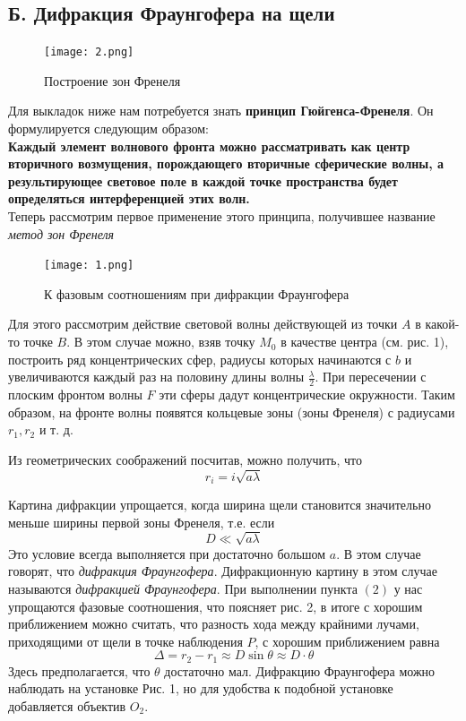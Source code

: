 \documentclass[a4paper,12pt]{article} %
\begin{document}
\subsection*{Б. Дифракция Фраунгофера на щели}
\begin{figure}
  \begin{center}
    \texttt{[image: 2.png]}
  \end{center}
  \caption{Построение зон Френеля}
\end{figure}
Для выкладок ниже нам потребуется знать \textbf{принцип Гюйгенса-Френеля}. Он формулируется следующим образом:\\
\textbf{Каждый элемент волнового фронта можно рассматривать как центр  вторичного возмущения, порождающего вторичные сферические волны, а результирующее световое поле  в каждой точке пространства будет определяться интерференцией этих волн.}\\
Теперь рассмотрим первое применение этого принципа, получившее название \textit{метод зон Френеля}

\begin{figure}
  \begin{center}
    \texttt{[image: 1.png]}
  \end{center}
  \caption{К фазовым соотношениям при дифракции Фраунгофера}
  \vspace{+30pt}
\end{figure}

Для этого рассмотрим действие световой волны действующей из точки $A$ в какой-то точке $B$.
В этом случае можно, взяв точку $M_0$ в качестве центра (см. рис. 1), построить ряд концентрических сфер, радиусы которых начинаются с $b$ и увеличиваются каждый раз на половину длины волны $\frac{\lambda}{2}$. При пересечении с плоским фронтом волны $F$ эти сферы дадут концентрические окружности. Таким образом, на фронте волны появятся кольцевые зоны (зоны Френеля) с радиусами $r_1, r_2$ и т. д.

Из геометрических соображений посчитав, можно получить, что 
\begin{equation}
r_i = i \sqrt{a \lambda}
\end{equation}

Картина дифракции упрощается, когда ширина щели становится значительно меньше ширины первой зоны Френеля, т.е. если 
\begin{equation}
D \ll\sqrt{a \lambda} 
\end{equation}	
Это условие всегда выполняется при достаточно большом $a$. В этом случае говорят, что \textit{дифракция Фраунгофера}. Дифракционную картину в этом случае называются \textit{дифракцией Фраунгофера}. При выполнении пункта $(2)$ у нас упрощаются фазовые соотношения, что поясняет рис. 2, в итоге с хорошим приближением можно считать, что разность хода между крайними лучами, приходящими от щели в точке наблюдения $P$, с хорошим приближением равна 
\begin{equation}
\Delta = r_2 - r_1 \approx D \sin \theta \approx D \cdot \theta
\end{equation}
Здесь предполагается, что $\theta$ достаточно мал.
Дифракцию Фраунгофера можно наблюдать на установке Рис. 1, но для удобства к подобной установке добавляется объектив $O_2$.
\end{document}
